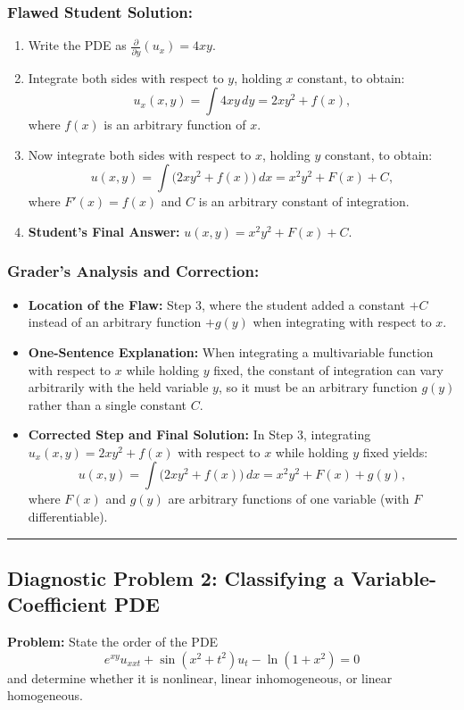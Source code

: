 \documentclass[11pt,a4paper]{article}
\begin{document}
\subsubsection*{Flawed Student Solution:}
\begin{enumerate}
    \item Write the PDE as $\frac{\partial}{\partial y}(u_x) = 4xy$.
    \item Integrate both sides with respect to $y$, holding $x$ constant, to obtain:
    \[
        u_x(x, y) = \int 4xy\,dy = 2xy^2 + f(x),
    \]
    where $f(x)$ is an arbitrary function of $x$.
    \item Now integrate both sides with respect to $x$, holding $y$ constant, to obtain:
    \[
        u(x, y) = \int \big(2xy^2 + f(x)\big)\,dx = x^2 y^2 + F(x) + C,
    \]
    where $F'(x) = f(x)$ and $C$ is an arbitrary constant of integration.
    \item \textbf{Student's Final Answer:} $u(x, y) = x^2 y^2 + F(x) + C$.
\end{enumerate}

\subsubsection*{Grader's Analysis and Correction:}
\begin{itemize}
    \item \textbf{Location of the Flaw:} Step 3, where the student added a constant $+C$ instead of an arbitrary function $+g(y)$ when integrating with respect to $x$.
    \item \textbf{One-Sentence Explanation:} When integrating a multivariable function with respect to $x$ while holding $y$ fixed, the constant of integration can vary arbitrarily with the held variable $y$, so it must be an arbitrary function $g(y)$ rather than a single constant $C$.
    \item \textbf{Corrected Step and Final Solution:}
    In Step 3, integrating $u_x(x, y) = 2xy^2 + f(x)$ with respect to $x$ while holding $y$ fixed yields:
    \[
        u(x, y) = \int \big(2xy^2 + f(x)\big)\,dx = x^2 y^2 + F(x) + g(y),
    \]
    where $F(x)$ and $g(y)$ are arbitrary functions of one variable (with $F$ differentiable).
\end{itemize}

\bigskip
\hrule
\bigskip

\subsection*{Diagnostic Problem 2: Classifying a Variable-Coefficient PDE}
\textbf{Problem:} State the order of the PDE
\[
    e^{xy} u_{xxt} + \sin(x^2 + t^2)u_t - \ln(1 + x^2) = 0
\]
and determine whether it is nonlinear, linear inhomogeneous, or linear homogeneous.
\end{document}
